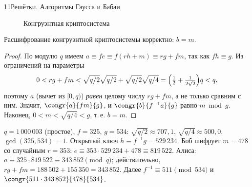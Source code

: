 \begin{lecture}{11}{Решётки. Алгоритмы Гаусса и Бабаи}
\begin{figure}[ht]
\centering
{}
\caption{Конгруэнтная криптосистема}
\label{l11:fig-congr}
\end{figure}

\begin{proposition}\label{l11:congr-correct}
Расшифрование конгруэнтной криптосистемы корректно: $b = m$.
\end{proposition}

\begin{proof}
По модулю $q$ имеем $a \equiv fe \equiv f(rh + m) \equiv rg + fm$, так как $fh \equiv g$. Из
ограничений на параметры
\[
  0 < rg + fm < \sqrt{q/2}\sqrt{q/2} + \sqrt{q/2}\sqrt{q/4} = \Bigl(\tfrac12 + \tfrac{1}{2\sqrt2}\Bigr) q < q,
\]
поэтому $a$ (вычет из $[0, q)$) \emph{равен} целому числу $rg + fm$, а не только сравним с ним.
Значит, $\congr{a}{fm}{g}$, и $\congr{b}{f^{-1}a}{g}$ равно $m \bmod g$. Наконец,
$0 < m < \sqrt{q/4} < g$, т.\,е. $b = m$.
\end{proof}

\begin{example}\label{l11:congr-example}
$q = 1\,000\,003$ (простое), $f = 325$, $g = 534$: $\sqrt{q/2} \approx 707{,}1$,
$\sqrt{q/4} \approx 500{,}0$, $\gcd(325, 534) = 1$. Открытый ключ $h \equiv f^{-1} g = 529\,234$.
Боб шифрует $m = 478$ со случайным $r = 353$: $e \equiv 353 \cdot 529\,234 + 478 \equiv 819\,522$.
Алиса: $a \equiv 325 \cdot 819\,522 \equiv 343\,852 \pmod q$; действительно,
$rg + fm = 188\,502 + 155\,350 = 343\,852$. Далее $f^{-1} \equiv 511 \pmod{534}$ и
$\congr{511 \cdot 343\,852}{478}{534}$.
\end{example}


\end{lecture}
